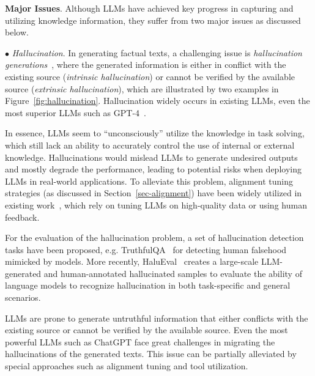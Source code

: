 {{{{{\textbf{Major Issues}. Although LLMs have achieved key progress in capturing and utilizing knowledge information, they suffer from two major issues as discussed below.

$\bullet$ \emph{Hallucination}.  In generating factual texts, a challenging issue is \emph{hallucination generations}~\cite{Bang-arxiv-2023-A, Huang-arxiv-2023-A}, where the generated information is either in conflict with the existing source (\emph{intrinsic hallucination}) or cannot be verified by the available source (\emph{extrinsic hallucination}), which are illustrated by two examples in Figure~\ref{fig:hallucination}.
Hallucination widely occurs in existing LLMs, even the most superior LLMs such as GPT-4~\cite{OpenAI-OpenAI-2023-GPT-4}. 

In essence, LLMs seem to  ``unconsciously''  utilize the knowledge in task solving, which still lack an ability to accurately control the use of internal or external knowledge. Hallucinations would mislead LLMs to generate undesired outputs and mostly degrade the performance, leading to potential risks when deploying LLMs in real-world applications. To alleviate this problem,  alignment tuning strategies (as discussed in Section~\ref{sec-alignment}) have been widely utilized in existing work~\cite{Ouyang-arxiv-2022-Training}, which rely on tuning LLMs on high-quality data or using human feedback. 

For the evaluation of the hallucination problem, a set of hallucination detection tasks have been proposed, e.g. TruthfulQA~\cite{Lin-ACL-2022-TruthfulQA} for detecting human falsehood mimicked by models. More recently, {HaluEval~\cite{Li-arxiv-2023-HaluEval} creates a large-scale LLM-generated and human-annotated hallucinated samples to evaluate the ability of language models to recognize hallucination in both task-specific and general scenarios.}

\begin{center}
\begin{tcolorbox}[colback=blue!5!white,colframe=blue!55!black,width=0.46\textwidth,title={Hallucination}]

LLMs are prone to generate untruthful information that either conflicts with the existing source or cannot be verified by the available source. Even the most powerful LLMs such as ChatGPT face great challenges in migrating the hallucinations of the generated texts. This issue can be partially alleviated by special approaches such as alignment tuning and  tool utilization. 


\end{tcolorbox}
\end{center}}}}}}
